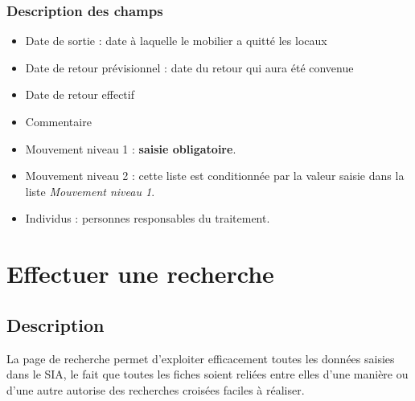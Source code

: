 \documentclass[letterpaper,10pt,french]{sphinxmanual}
\begin{document}
\subsection{Description des champs}
\label{manuel/formulaire_regie:description-des-champs}\begin{itemize}
\item {} 
Date de sortie : date à laquelle le mobilier a quitté les locaux

\item {} 
Date de retour prévisionnel : date du retour qui aura été convenue

\item {} 
Date de retour effectif

\item {} 
Commentaire

\item {} 
Mouvement niveau 1 : \textbf{saisie obligatoire}.

\item {} 
Mouvement niveau 2 : cette liste est conditionnée par la valeur saisie dans la liste \emph{Mouvement niveau 1}.

\item {} 
Individus : personnes responsables du traitement.

\end{itemize}


\chapter{Effectuer une recherche}
\label{manuel/formulaire_recherche:effectuer-une-recherche}\label{manuel/formulaire_recherche::doc}

\section{Description}
\label{manuel/formulaire_recherche:description}
La page de recherche permet d'exploiter efficacement toutes les données saisies dans le SIA, le fait que toutes les fiches soient reliées entre elles d'une manière ou d'une autre autorise des recherches croisées faciles à réaliser.
\end{document}
